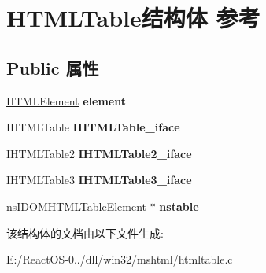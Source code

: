 \hypertarget{struct_h_t_m_l_table}{}\section{H\+T\+M\+L\+Table结构体 参考}
\label{struct_h_t_m_l_table}
\subsection*{Public 属性}
\begin{DoxyCompactItemize}
\item 
\mbox{\label{struct_h_t_m_l_table_a3ba02ed180283f71929b97b46e6d180e}} 
\hyperlink{struct_h_t_m_l_element}{H\+T\+M\+L\+Element} {\bfseries element}
\item 
\mbox{\label{struct_h_t_m_l_table_aadae11e77c5506b8a7167c3ac8ca511d}} 
I\+H\+T\+M\+L\+Table {\bfseries I\+H\+T\+M\+L\+Table\+\_\+iface}
\item 
\mbox{\label{struct_h_t_m_l_table_ad494cf18257b037b5226fe1477fa5cff}} 
I\+H\+T\+M\+L\+Table2 {\bfseries I\+H\+T\+M\+L\+Table2\+\_\+iface}
\item 
\mbox{\label{struct_h_t_m_l_table_a48852945f211622c025f1f710d7bb6d5}} 
I\+H\+T\+M\+L\+Table3 {\bfseries I\+H\+T\+M\+L\+Table3\+\_\+iface}
\item 
\mbox{\label{struct_h_t_m_l_table_aeaa5f9dfe7722e190ee82b466ae37ce3}} 
\hyperlink{interfacens_i_d_o_m_h_t_m_l_table_element}{ns\+I\+D\+O\+M\+H\+T\+M\+L\+Table\+Element} $\ast$ {\bfseries nstable}
\end{DoxyCompactItemize}


该结构体的文档由以下文件生成\+:\begin{DoxyCompactItemize}
\item 
E\+:/\+React\+O\+S-\/0../dll/win32/mshtml/htmltable.\+c\end{DoxyCompactItemize}
